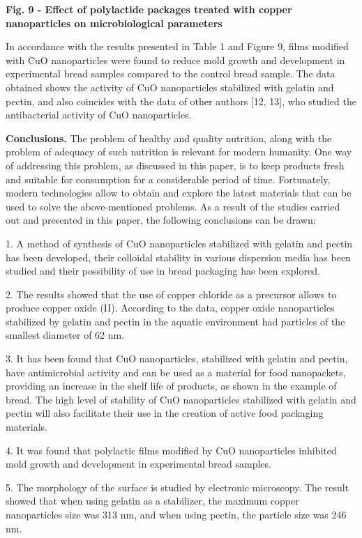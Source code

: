 {\bfseries Fig. 9 - Effect of polylactide packages treated with copper
nanoparticles on microbiological parameters}

In accordance with the results presented in Table 1 and Figure 9, films
modified with CuO nanoparticles were found to reduce mold growth and
development in experimental bread samples compared to the control bread
sample. The data obtained shows the activity of CuO nanoparticles
stabilized with gelatin and pectin, and also coincides with the data of
other authors {[}12, 13{]}, who studied the antibacterial activity of
CuO nanoparticles.

{\bfseries Conclusions.} The problem of healthy and quality nutrition,
along with the problem of adequacy of such nutrition is relevant for
modern humanity. One way of addressing this problem, as discussed in
this paper, is to keep products fresh and suitable for consumption for a
considerable period of time. Fortunately, modern technologies allow to
obtain and explore the latest materials that can be used to solve the
above-mentioned problems. As a result of the studies carried out and
presented in this paper, the following conclusions can be drawn:

1. A method of synthesis of CuO nanoparticles stabilized with gelatin
and pectin has been developed, their colloidal stability in various
dispersion media has been studied and their possibility of use in bread
packaging has been explored.

2. The results showed that the use of copper chloride as a precursor
allows to produce copper oxide (II). According to the data, copper oxide
nanoparticles stabilized by gelatin and pectin in the aquatic
environment had particles of the smallest diameter of 62 nm.

3. It has been found that CuO nanoparticles, stabilized with gelatin and
pectin, have antimicrobial activity and can be used as a material for
food nanopackets, providing an increase in the shelf life of products,
as shown in the example of bread. The high level of stability of CuO
nanoparticles stabilized with gelatin and pectin will also facilitate
their use in the creation of active food packaging materials.

4. It was found that polylactic films modified by CuO nanoparticles
inhibited mold growth and development in experimental bread samples.

5. The morphology of the surface is studied by electronic microscopy.
The result showed that when using gelatin as a stabilizer, the maximum
copper nanoparticles size was 313 nm, and when using pectin, the
particle size was 246 nm.

